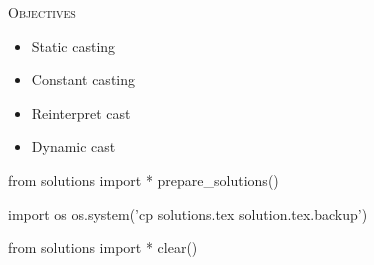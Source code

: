 
\textsc{Objectives}

\begin{itemize}
\item
  Static casting
\item
  Constant casting
\item
  Reinterpret cast
\item
  Dynamic cast
\end{itemize}





\begin{python0}
from solutions import *
prepare_solutions()
\end{python0}
\begin{python}
import os
os.system('cp solutions.tex solution.tex.backup')  
\end{python}

\begin{python0}
from solutions import *
clear()
\end{python0}
